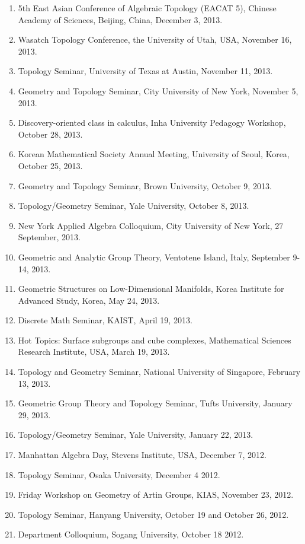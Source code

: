 \documentclass[11pt,a4paper]{article}
\begin{document}
\begin{enumerate}[leftmargin=1.5em, label=\arabic*.]
\item 5th East Asian Conference of Algebraic Topology (EACAT 5), Chinese Academy of Sciences, Beijing, China, December 3, 2013.
\item Wasatch Topology Conference, the University of Utah, USA, November 16, 2013.
\item Topology Seminar, University of Texas at Austin, November 11, 2013.
\item Geometry and Topology Seminar, City University of New York, November 5, 2013.
\item Discovery-oriented class in calculus, Inha University Pedagogy Workshop, October 28, 2013.
\item Korean Mathematical Society Annual Meeting, University of Seoul, Korea, October 25, 2013.
\item Geometry and Topology Seminar, Brown University, October 9, 2013.
\item Topology/Geometry Seminar, Yale University, October 8, 2013.
\item New York Applied Algebra Colloquium, City University of New York, 27 September, 2013.
\item Geometric and Analytic Group Theory, Ventotene Island, Italy, September 9-14, 2013.
\item Geometric Structures on Low-Dimensional Manifolds, Korea Institute for Advanced Study, Korea, May 24, 2013.
\item Discrete Math Seminar, KAIST, April 19, 2013.
\item Hot Topics: Surface subgroups and cube complexes, Mathematical Sciences Research Institute, USA, March 19, 2013.
\item Topology and Geometry Seminar, National University of Singapore, February 13, 2013.
\item Geometric Group Theory and Topology Seminar, Tufts University, January 29, 2013.
\item Topology/Geometry Seminar, Yale University, January 22, 2013.
\item Manhattan Algebra Day, Stevens Institute, USA, December 7, 2012.
\item Topology Seminar, Osaka University, December 4 2012.
\item Friday Workshop on Geometry of Artin Groups, KIAS, November 23, 2012.
\item Topology Seminar, Hanyang University, October 19 and October 26, 2012.
\item Department Colloquium, Sogang University, October 18 2012.

\end{enumerate}
\end{document}
